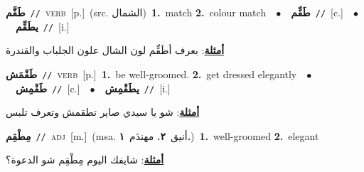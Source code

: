 \documentclass[10pt,a4paper,twoside]{article} %
\begin{document}
\begin{multicols}{2}
{\setlength\topsep{0pt}\textbf{\foreignlanguage{arabic}{طَقَّم}}\ {\color{gray}\texttt{//}\color{black}}\ \textsc{verb}\ [p.]\ (src. \color{gray}\foreignlanguage{arabic}{الشمال}\color{black})\ \textbf{1.}~match  \textbf{2.}~colour match\ \ $\bullet$\ \ \setlength\topsep{0pt}\textbf{\foreignlanguage{arabic}{طَقِّم}}\ {\color{gray}\texttt{//}\color{black}}\ [c.]\ \ $\bullet$\ \ \setlength\topsep{0pt}\textbf{\foreignlanguage{arabic}{يطَقِّم}}\ {\color{gray}\texttt{//}\color{black}}\ [i.]\  \begin{flushright}\color{gray}\foreignlanguage{arabic}{\textbf{\underline{\foreignlanguage{arabic}{أمثلة}}}: بعرف أطَقِّم لون الشال علون الجلباب والقندرة}\end{flushright}\color{black}} \vspace{2mm}

{\setlength\topsep{0pt}\textbf{\foreignlanguage{arabic}{طَقْمَش}}\ {\color{gray}\texttt{//}\color{black}}\ \textsc{verb}\ [p.]\ \textbf{1.}~be well-groomed.  \textbf{2.}~get dressed elegantly\ \ $\bullet$\ \ \setlength\topsep{0pt}\textbf{\foreignlanguage{arabic}{طَقْمِش}}\ {\color{gray}\texttt{//}\color{black}}\ [c.]\ \ $\bullet$\ \ \setlength\topsep{0pt}\textbf{\foreignlanguage{arabic}{يطَقْمِش}}\ {\color{gray}\texttt{//}\color{black}}\ [i.]\  \begin{flushright}\color{gray}\foreignlanguage{arabic}{\textbf{\underline{\foreignlanguage{arabic}{أمثلة}}}: شو يا سيدي صاير تطقمش وتعرف تلبس}\end{flushright}\color{black}} \vspace{2mm}

{\setlength\topsep{0pt}\textbf{\foreignlanguage{arabic}{مِطْقِم}}\ {\color{gray}\texttt{//}\color{black}}\ \textsc{adj}\ [m.]\ \color{gray}(msa. \foreignlanguage{arabic}{أنيق}~\foreignlanguage{arabic}{\textbf{٢.}}  \foreignlanguage{arabic}{مهندَم}~\foreignlanguage{arabic}{\textbf{١.}})\color{black}\ \textbf{1.}~well-groomed  \textbf{2.}~elegant\  \begin{flushright}\color{gray}\foreignlanguage{arabic}{\textbf{\underline{\foreignlanguage{arabic}{أمثلة}}}: شايفك اليوم مِطْقِم شو الدعوة؟}\end{flushright}\color{black}} \vspace{2mm}


\end{multicols}
\end{document}
